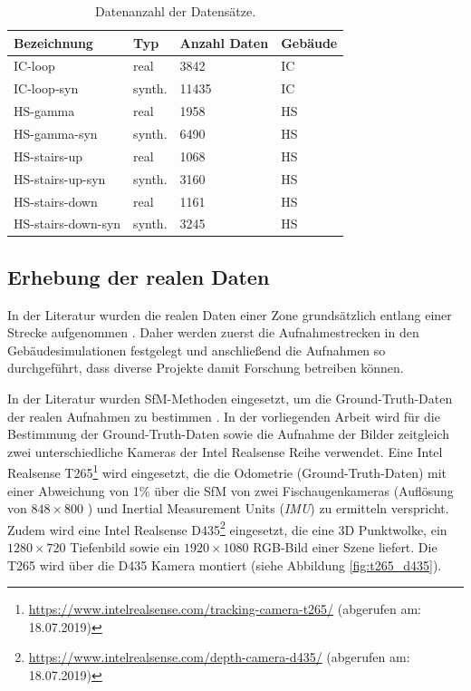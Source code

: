 \begin{table}[H]
	\centering
	\caption{Datenanzahl der Datensätze.}
	\begin{tabularx}{1.0\textwidth}{p{3.5cm} p{1.8cm} X  >{\centering\arraybackslash}p{1.7cm} }
		\textbf{Bezeichnung} & \textbf{Typ} & \textbf{Anzahl Daten} & \textbf{Gebäude}\\
		\hline
		IC-loop & real & 3842 & IC\\
		\hline
		IC-loop-syn & synth. & 11435 & IC\\
		\hline
		HS-gamma & real & 1958 & HS\\
		\hline
		HS-gamma-syn & synth. &  6490 & HS\\
		\hline
		HS-stairs-up & real & 1068 & HS\\
		\hline
		HS-stairs-up-syn & synth. & 3160 & HS\\
		\hline
		HS-stairs-down & real & 1161 & HS\\
		\hline
		HS-stairs-down-syn & synth. &  3245 & HS\\
	\end{tabularx}
	\label{tab:datasets}
\end{table}

\vspace*{\fill}
\cleardoublepage

\subsection{Erhebung der realen Daten}
\label{subsec:record_real_data}
In der Literatur wurden die realen Daten einer Zone grundsätzlich entlang einer Strecke aufgenommen \cite{kendallPoseNetConvolutionalNetwork2015, clarkVidLocDeepSpatioTemporal2017, acharyaBIMPoseNetIndoorCamera2019}. Daher werden zuerst die Aufnahmestrecken in den Gebäudesimulationen festgelegt und anschließend die Aufnahmen so durchgeführt, dass diverse Projekte damit Forschung betreiben können. 

In der Literatur wurden SfM-Methoden eingesetzt, um die Ground-Truth-Daten der realen Aufnahmen zu bestimmen \cite{kendallPoseNetConvolutionalNetwork2015, clarkVidLocDeepSpatioTemporal2017, acharyaBIMPoseNetIndoorCamera2019}. 
In der vorliegenden Arbeit wird für die Bestimmung der Ground-Truth-Daten sowie die Aufnahme der Bilder zeitgleich zwei unterschiedliche Kameras der Intel Realsense Reihe verwendet. Eine Intel Realsense T265\footnote{\url{https://www.intelrealsense.com/tracking-camera-t265/} (abgerufen am: 18.07.2019)} wird eingesetzt, die die Odometrie (Ground-Truth-Daten) mit einer Abweichung von 1\%  über die SfM von zwei Fischaugenkameras (Auflösung von $848 \times 800$ ) und Inertial Measurement Units (\textit{IMU}) zu ermitteln verspricht. Zudem wird eine Intel Realsense D435\footnote{ \url{https://www.intelrealsense.com/depth-camera-d435/} (abgerufen am: 18.07.2019)} eingesetzt, die eine 3D Punktwolke, ein $1280\times720$ Tiefenbild sowie ein $1920\times1080$ RGB-Bild einer Szene liefert. Die T265 wird über die D435 Kamera montiert (siehe Abbildung \ref{fig:t265_d435}).

